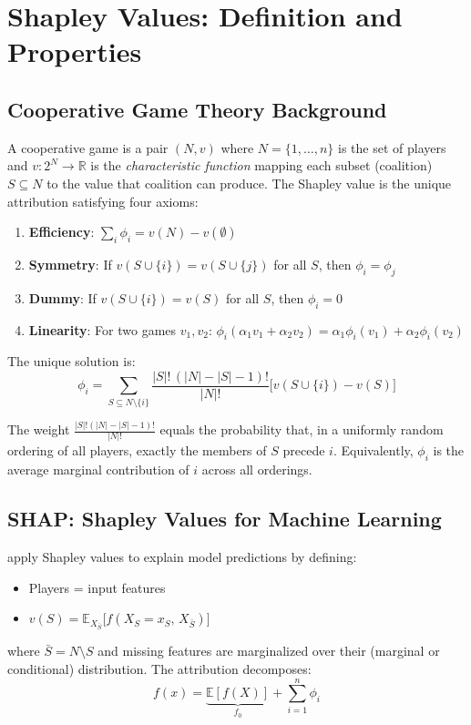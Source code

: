 \documentclass[12pt]{article}
\begin{document}
\section{Shapley Values: Definition and Properties}

\subsection{Cooperative Game Theory Background}

A cooperative game is a pair $(N, v)$ where $N = \{1, \ldots, n\}$ is the set of players
and $v: 2^N \to \mathbb{R}$ is the \emph{characteristic function} mapping each subset
(coalition) $S \subseteq N$ to the value that coalition can produce. The Shapley value
\citep{shapley1953value} is the unique attribution satisfying four axioms:
\begin{enumerate}
\item \textbf{Efficiency}: $\sum_i \phi_i = v(N) - v(\emptyset)$
\item \textbf{Symmetry}: If $v(S \cup \{i\}) = v(S \cup \{j\})$ for all $S$, then
      $\phi_i = \phi_j$
\item \textbf{Dummy}: If $v(S \cup \{i\}) = v(S)$ for all $S$, then $\phi_i = 0$
\item \textbf{Linearity}: For two games $v_1, v_2$: $\phi_i(\alpha_1 v_1 + \alpha_2 v_2)
      = \alpha_1 \phi_i(v_1) + \alpha_2 \phi_i(v_2)$
\end{enumerate}

The unique solution is:
\begin{equation}
\phi_i = \sum_{S \subseteq N \setminus \{i\}}
\frac{|S|!\,(|N|-|S|-1)!}{|N|!}
\bigl[v(S \cup \{i\}) - v(S)\bigr]
\label{eq:shapley}
\end{equation}

The weight $\frac{|S|!(|N|-|S|-1)!}{|N|!}$ equals the probability that, in a uniformly
random ordering of all players, exactly the members of $S$ precede $i$. Equivalently,
$\phi_i$ is the average marginal contribution of $i$ across all orderings.

\subsection{SHAP: Shapley Values for Machine Learning}

\citet{lundberg2017unified} apply Shapley values to explain model predictions by defining:
\begin{itemize}
\item Players = input features
\item $v(S) = \mathbb{E}_{X_{\bar{S}}}\bigl[f(X_S = x_S,\, X_{\bar{S}})\bigr]$
\end{itemize}
where $\bar{S} = N \setminus S$ and missing features are marginalized over their
(marginal or conditional) distribution. The attribution decomposes:
\begin{equation}
f(x) = \underbrace{\mathbb{E}[f(X)]}_{f_0} + \sum_{i=1}^n \phi_i
\end{equation}
\end{document}
